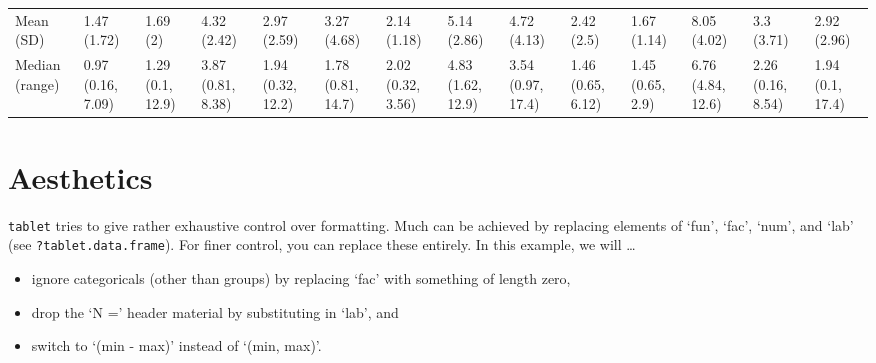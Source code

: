 \documentclass[
]{article}
\newenvironment{Shaded}{\begin{snugshade}}{\end{snugshade}}
\newcommand{\DataTypeTok}[1]{\textcolor[rgb]{0.13,0.29,0.53}{#1}}
\newcommand{\KeywordTok}[1]{\textcolor[rgb]{0.13,0.29,0.53}{\textbf{#1}}}
\newcommand{\NormalTok}[1]{#1}
\newcommand{\OperatorTok}[1]{\textcolor[rgb]{0.81,0.36,0.00}{\textbf{#1}}}
\newcommand{\OtherTok}[1]{\textcolor[rgb]{0.56,0.35,0.01}{#1}}
\newcommand{\StringTok}[1]{\textcolor[rgb]{0.31,0.60,0.02}{#1}}
\begin{document}
\begin{table}[H]
{\begin{tabular}[t]{llllllllllllll}
\hspace{1em}Mean (SD) & 1.47 (1.72) & 1.69 (2) & 4.32 (2.42) & 2.97 (2.59) & 3.27 (4.68) & 2.14 (1.18) & 5.14 (2.86) & 4.72 (4.13) & 2.42 (2.5) & 1.67 (1.14) & 8.05 (4.02) & 3.3 (3.71) & 2.92 (2.96)\\
\hspace{1em}Median (range) & 0.97 (0.16, 7.09) & 1.29 (0.1, 12.9) & 3.87 (0.81, 8.38) & 1.94 (0.32, 12.2) & 1.78 (0.81, 14.7) & 2.02 (0.32, 3.56) & 4.83 (1.62, 12.9) & 3.54 (0.97, 17.4) & 1.46 (0.65, 6.12) & 1.45 (0.65, 2.9) & 6.76 (4.84, 12.6) & 2.26 (0.16, 8.54) & 1.94 (0.1, 17.4)\\
\bottomrule
\end{tabular}}
\end{table}

\hypertarget{aesthetics}{%
\section{Aesthetics}\label{aesthetics}}

\texttt{tablet} tries to give rather exhaustive control over formatting.
Much can be achieved by replacing elements of `fun', `fac', `num', and
`lab' (see \texttt{?tablet.data.frame}). For finer control, you can
replace these entirely. In this example, we will \ldots{}

\begin{itemize}
\item
  ignore categoricals (other than groups) by replacing `fac' with
  something of length zero,
\item
  drop the `N =' header material by substituting in `lab', and
\item
  switch to `(min - max)' instead of `(min, max)'.
\end{itemize}

\begin{Shaded}
\end{Shaded}
\end{document}
